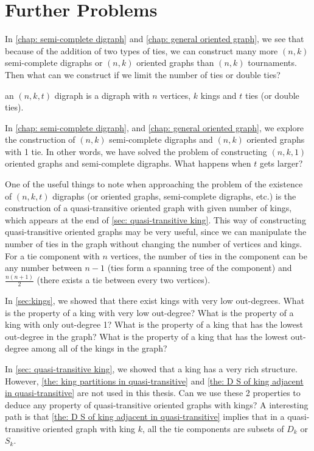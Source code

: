 \chapter{Further Problems}

In \cref{chap: semi-complete digraph} and \cref{chap: general oriented graph},
we see that because of the addition of two types of ties,
we can construct many more \((n, k)\) semi-complete digraphs
or \((n, k)\) oriented graphs than \((n, k)\) tournaments.
Then what can we construct if we limit the number of ties
or double ties?

\begin{definition}
  an \((n, k, t)\) digraph is a digraph with \(n\) vertices,
  \(k\) kings and \(t\) ties (or double ties).
\end{definition}

In \cref{chap: semi-complete digraph}, and \cref{chap: general oriented graph},
we explore the construction of \((n, k)\) semi-complete digraphs
and \((n, k)\) oriented graphs with 1 tie.
In other words, we have solved the problem of constructing
\((n, k, 1)\) oriented graphs and semi-complete digraphs.
What happens when \(t\) gets larger?

One of the useful things to note when approaching the
problem of the existence of \((n, k, t)\) digraphs
(or oriented graphs, semi-complete digraphs, etc.) 
is the construction of a quasi-transitive oriented graph
with given number of kings, which appears at the end of
 \cref{sec: quasi-transitive king}.
This way of constructing quasi-transitive oriented graphs
may be very useful,
since we can manipulate the number of ties in the graph
without changing the number of vertices and kings.
For a tie component with \(n\) vertices,
the number of ties in the component can be any number
between \(n - 1\)
(ties form a spanning tree of the component)
and \(\frac{n(n+1)}{2}\)
(there exists a tie between every two vertices).

In \cref{sec:kings}, we showed that there exist kings with very
low out-degrees.
What is the property of a king with very low out-degree?
What is the property of a king with only out-degree 1?
What is the property of a king that has the lowest out-degree
in the graph?
What is the property of a king that has the lowest out-degree
among all of the kings in the graph?

In \cref{sec: quasi-transitive king},
we showed that a king has a very rich structure.
However, \cref{the: king partitions in quasi-transitive}
and \cref{the: D S of king adjacent in quasi-transitive}
are not used in this thesis.
Can we use these 2 properties to deduce any property
of quasi-transitive oriented graphs with kings?
A interesting path is that
\cref{the: D S of king adjacent in quasi-transitive}
implies that in a quasi-transitive oriented graph with king \(k\),
all the tie components are subsets of \(D_k\) or \(S_k\).

